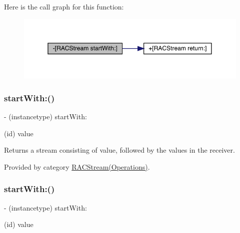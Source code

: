 Here is the call graph for this function\+:\nopagebreak
\begin{figure}[H]
\begin{center}
\leavevmode
\includegraphics[width=350pt]{interface_r_a_c_stream_a2f255fad695085b91a1ebc1e0a78c865_cgraph}
\end{center}
\end{figure}
\mbox{\label{interface_r_a_c_stream_a2f255fad695085b91a1ebc1e0a78c865}} 
\subsubsection{\texorpdfstring{start\+With\+:()}{startWith:()}\hspace{0.1cm}{\footnotesize\ttfamily [2/3]}}
{\footnotesize\ttfamily -\/ (instancetype) start\+With\+: \begin{DoxyParamCaption}\item[{(id)}]{value }\end{DoxyParamCaption}}

Returns a stream consisting of {\ttfamily value}, followed by the values in the receiver. 

Provided by category \mbox{\hyperlink{category_r_a_c_stream_07_operations_08_a2f255fad695085b91a1ebc1e0a78c865}{R\+A\+C\+Stream(\+Operations)}}.

\mbox{\label{interface_r_a_c_stream_a2f255fad695085b91a1ebc1e0a78c865}} 
\subsubsection{\texorpdfstring{start\+With\+:()}{startWith:()}\hspace{0.1cm}{\footnotesize\ttfamily [3/3]}}
{\footnotesize\ttfamily -\/ (instancetype) start\+With\+: \begin{DoxyParamCaption}\item[{(id)}]{value }\end{DoxyParamCaption}}

